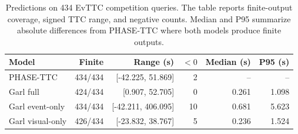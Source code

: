 \begin{table}[tbp]
\centering\small
\caption{Predictions on 434 EvTTC competition queries. The table reports finite-output coverage, signed TTC range, and negative counts. Median and P95 summarize absolute differences from PHASE-TTC where both models produce finite outputs. }
\label{tab:evttc-model-summary}
\begin{tabular}{@{}lrrrrr@{}}
\toprule
\textbf{Model} & \textbf{Finite} & \textbf{Range (s)} & \textbf{$<0$} & \textbf{Median (s)} & \textbf{P95 (s)} \\
\midrule
PHASE-TTC & 434/434 & [-42.225, 51.869] & 2 & -- & -- \\
Garl full & 424/434 & [0.907, 52.705] & 0 & 0.261 & 1.098 \\
Garl event-only & 434/434 & [-42.211, 406.095] & 10 & 0.681 & 5.623 \\
Garl visual-only & 426/434 & [-23.832, 38.767] & 5 & 0.236 & 1.524 \\
\bottomrule
\end{tabular}
\end{table}
